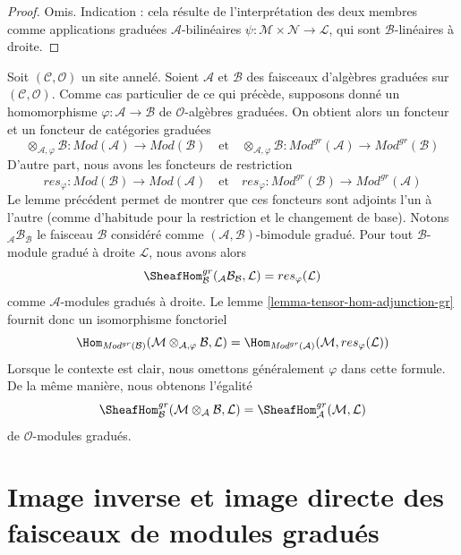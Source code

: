 \begin{proof}
Omis. Indication : cela résulte de l'interprétation des deux membres
comme applications graduées $\mathcal{A}$-bilinéaires
$\psi : \mathcal{M} \times \mathcal{N} \to \mathcal{L}$,
qui sont $\mathcal{B}$-linéaires à droite.
\end{proof}

\noindent
Soit $(\mathcal{C}, \mathcal{O})$ un site annelé. Soient $\mathcal{A}$ et
$\mathcal{B}$ des faisceaux d'algèbres graduées sur
$(\mathcal{C}, \mathcal{O})$.
Comme cas particulier de ce qui précède, supposons donné
un homomorphisme $\varphi : \mathcal{A} \to \mathcal{B}$
de $\mathcal{O}$-algèbres graduées. On obtient alors un foncteur
et un foncteur de catégories
graduées $$
\otimes_{\mathcal{A}, \varphi} \mathcal{B}
: \textit{Mod}(\mathcal{A})
\longrightarrow
\textit{Mod}(\mathcal{B})
\quad\text{et}\quad
\otimes_{\mathcal{A}, \varphi} \mathcal{B} :
\textit{Mod}^{gr}(\mathcal{A})
\longrightarrow
\textit{Mod}^{gr}(\mathcal{B})
$$
D'autre part, nous avons les foncteurs de restriction
$$
res_\varphi :
\textit{Mod}(\mathcal{B})
\longrightarrow
\textit{Mod}(\mathcal{A})
\quad\text{et}\quad
res_\varphi :
\textit{Mod}^{gr}(\mathcal{B})
\longrightarrow
\textit{Mod}^{gr}(\mathcal{A})
$$ Le
lemme précédent permet de montrer que ces foncteurs sont adjoints
l'un à l'autre (comme d'habitude pour la restriction et le changement
de base). Notons ${}_\mathcal{A}\mathcal{B}_\mathcal{B}$
le faisceau $\mathcal{B}$ considéré comme $(\mathcal{A}, \mathcal{B})$-bimodule
gradué. Pour tout $\mathcal{B}$-module gradué à droite $\mathcal{L}$,
nous
avons alors $$
\SheafHom_\mathcal{B}^{gr}({}_\mathcal{A}\mathcal{B}_\mathcal{B}, \mathcal{L})
= res_\varphi(\mathcal{L})
$$
comme $\mathcal{A}$-modules
gradués à droite. Le lemme \ref{lemma-tensor-hom-adjunction-gr}
fournit donc un isomorphisme
fonctoriel $$
\Hom_{\textit{Mod}^{gr}(\mathcal{B})}(
\mathcal{M} \otimes_{\mathcal{A}, \varphi} \mathcal{B}, \mathcal{L})
= \Hom_{\textit{Mod}^{gr}(\mathcal{A})}(
\mathcal{M}, res_\varphi(\mathcal{L}))
$$
Lorsque le contexte est clair, nous omettons généralement $\varphi$
dans cette formule. De la même manière, nous
obtenons l'égalité
$$
\SheafHom^{gr}_\mathcal{B}(
\mathcal{M} \otimes_\mathcal{A} \mathcal{B}, \mathcal{L})
= \SheafHom_\mathcal{A}^{gr}(\mathcal{M}, \mathcal{L})
$$
de $\mathcal{O}$-modules gradués.




\section{Image inverse et image directe des faisceaux de modules gradués}
\label{section-functoriality-graded}

